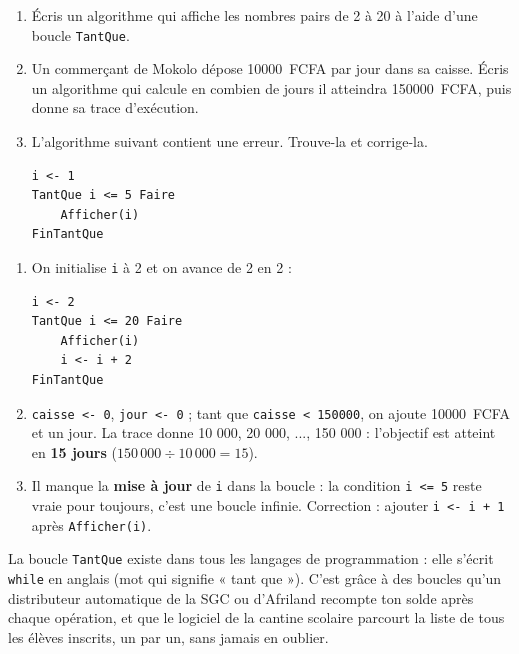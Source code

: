 \documentclass[11pt]{article}
\begin{document}
\begin{exercice}
\begin{enumerate}
  \item Écris un algorithme qui affiche les nombres pairs de 2 à 20 à l'aide d'une boucle \texttt{TantQue}.
  \item Un commerçant de Mokolo dépose \SI{10000}{FCFA} par jour dans sa caisse. Écris un algorithme qui calcule en combien de jours il atteindra \SI{150000}{FCFA}, puis donne sa trace d'exécution.
  \item L'algorithme suivant contient une erreur. Trouve-la et corrige-la.
\begin{lstlisting}
i <- 1
TantQue i <= 5 Faire
    Afficher(i)
FinTantQue
\end{lstlisting}
\end{enumerate}
\end{exercice}

\begin{corrige}
\begin{enumerate}
  \item On initialise \texttt{i} à 2 et on avance de 2 en 2 :
\begin{lstlisting}
i <- 2
TantQue i <= 20 Faire
    Afficher(i)
    i <- i + 2
FinTantQue
\end{lstlisting}
  \item \texttt{caisse <- 0}, \texttt{jour <- 0} ; tant que \texttt{caisse < 150000}, on ajoute \SI{10000}{FCFA} et un jour. La trace donne 10 000, 20 000, ..., 150 000 : l'objectif est atteint en \textbf{15 jours} ($150\,000 \div 10\,000 = 15$).
  \item Il manque la \textbf{mise à jour} de \texttt{i} dans la boucle : la condition \texttt{i <= 5} reste vraie pour toujours, c'est une boucle infinie. Correction : ajouter \texttt{i <- i + 1} après \texttt{Afficher(i)}.
\end{enumerate}
\end{corrige}

\begin{savaistu}
La boucle \texttt{TantQue} existe dans tous les langages de programmation : elle s'écrit \texttt{while} en anglais (mot qui signifie « tant que »). C'est grâce à des boucles qu'un distributeur automatique de la SGC ou d'Afriland recompte ton solde après chaque opération, et que le logiciel de la cantine scolaire parcourt la liste de tous les élèves inscrits, un par un, sans jamais en oublier.
\end{savaistu}
\end{document}
